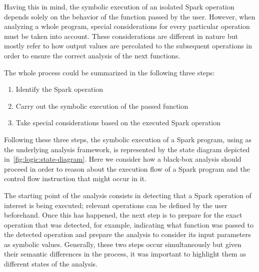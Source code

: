 %	
%	
%	
%	

Having this in mind, the symbolic execution of an isolated Spark operation depends solely on the behavior of the function passed by the user. However, when analyzing a whole program, special considerations for every particular operation must be taken into account. These considerations are different in nature but mostly refer to how output values are percolated to the subsequent operations in order to ensure the correct analysis of the next functions.

The whole process could be summarized in the following three steps:
\begin{enumerate}
	\item Identify the Spark operation
	\item Carry out the symbolic execution of the passed function
	\item Take special considerations based on the executed Spark operation
\end{enumerate}

Following these three steps, the symbolic execution of a Spark program, using \spf{} as the underlying analysis framework, is represented by the state diagram depicted in~\ref{fig:logic:state-diagram}. Here we consider how a black-box analysis should proceed in order to reason about the execution flow of a Spark program and the control flow instruction that might occur in it.

The starting point of the analysis consists in detecting that a Spark operation of interest is being executed; relevant operations can be defined by the user beforehand. Once this has happened, the next step is to prepare for the exact operation that was detected, for example, indicating what function was passed to the detected operation and prepare the \spf{} analysis to consider its input parameters as symbolic values. Generally, these two steps occur simultaneously but given their semantic differences in the process, it was important to highlight them as different states of the analysis.

